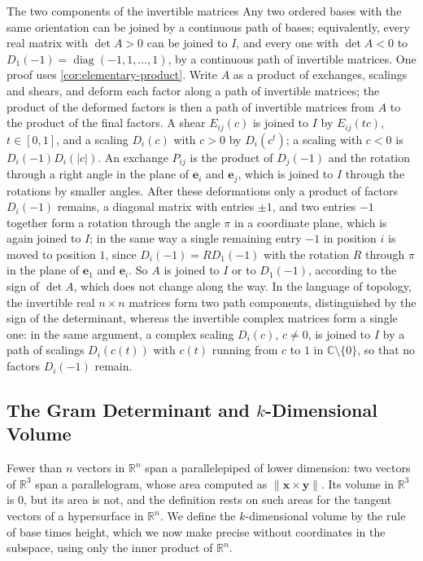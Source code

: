 \begin{note}{The two components of the invertible matrices}
Any two ordered bases with the same orientation can be joined by a continuous path of bases; equivalently, every real matrix with $\det A>0$ can be joined to $I$, and every one with $\det A<0$ to $D_1(-1)=\operatorname{diag}(-1,1,\ldots,1)$, by a continuous path of invertible matrices. One proof uses \cref{cor:elementary-product}. Write $A$ as a product of exchanges, scalings and shears, and deform each factor along a path of invertible matrices; the product of the deformed factors is then a path of invertible matrices from $A$ to the product of the final factors. A shear $E_{ij}(c)$ is joined to $I$ by $E_{ij}(tc)$, $t\in[0,1]$, and a scaling $D_i(c)$ with $c>0$ by $D_i(c^t)$; a scaling with $c<0$ is $D_i(-1)D_i(|c|)$. An exchange $P_{ij}$ is the product of $D_j(-1)$ and the rotation through a right angle in the plane of $\mathbf e_i$ and $\mathbf e_j$, which is joined to $I$ through the rotations by smaller angles. After these deformations only a product of factors $D_i(-1)$ remains, a diagonal matrix with entries $\pm1$, and two entries $-1$ together form a rotation through the angle $\pi$ in a coordinate plane, which is again joined to $I$; in the same way a single remaining entry $-1$ in position $i$ is moved to position $1$, since $D_i(-1)=RD_1(-1)$ with the rotation $R$ through $\pi$ in the plane of $\mathbf e_1$ and $\mathbf e_i$. So $A$ is joined to $I$ or to $D_1(-1)$, according to the sign of $\det A$, which does not change along the way. In the language of topology, the invertible real $n\times n$ matrices form two path components, distinguished by the sign of the determinant, whereas the invertible complex matrices form a single one: in the same argument, a complex scaling $D_i(c)$, $c\ne0$, is joined to $I$ by a path of scalings $D_i(c(t))$ with $c(t)$ running from $c$ to $1$ in $\mathbb C\setminus\{0\}$, so that no factors $D_i(-1)$ remain.
\end{note}

\subsection{The Gram Determinant and \texorpdfstring{$k$}{k}-Dimensional Volume}

Fewer than $n$ vectors in $\mathbb R^n$ span a parallelepiped of lower dimension: two vectors of $\mathbb R^3$ span a parallelogram, whose area  computed as $\|\mathbf x\times\mathbf y\|$. Its volume in $\mathbb R^3$ is $0$, but its area is not, and the definition  rests on such areas for the tangent vectors of a hypersurface in $\mathbb R^n$. We define the $k$-dimensional volume by the rule of base times height, which we now make precise without coordinates in the subspace, using only the inner product of $\mathbb R^n$.

